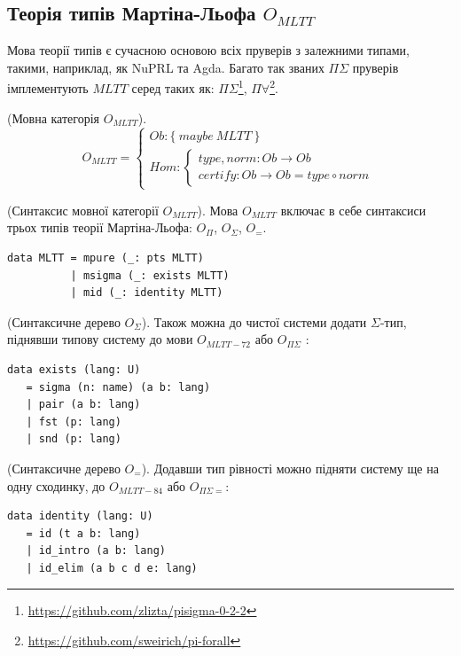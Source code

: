 \newpage
\subsection{Теорія типів Мартіна-Льофа $O_{MLTT}$}

Мова теорії типів є сучасною основою всіх пруверів з залежними типами,
такими, наприклад, як NuPRL та Agda. Багато так званих $\Pi\Sigma$ пруверів
імплементують $MLTT$ серед таких як:
$\Pi\Sigma$\footnote{\url{https://github.com/zlizta/pisigma-0-2-2}},
$\Pi\forall$\footnote{\url{https://github.com/sweirich/pi-forall}}.

\begin{definition} (Мовна категорія $O_{MLTT}$).
\begin{equation}
O_{MLTT} =
\begin{cases}
Ob: \{\ maybe\ MLTT\ \} \\
Hom: \begin{cases}
type,norm: Ob \rightarrow Ob \\
certify: Ob \rightarrow Ob = type \circ norm
\end{cases}
\end{cases}
\end{equation}
\end{definition}

\begin{definition} (Синтаксис мовної категорії $O_{MLTT}$).
Мова $O_{MLTT}$ включає в себе синтаксиси трьох типів
теорії Мартіна-Льофа: $O_\Pi$, $O_\Sigma$, $O_=$.
\begin{lstlisting}
data MLTT = mpure (_: pts MLTT)
          | msigma (_: exists MLTT)
          | mid (_: identity MLTT)
\end{lstlisting}
\end{definition}

\begin{definition} (Синтаксичне дерево $O_\Sigma$).
Також можна до чистої системи додати $\Sigma$-тип,
піднявши типову систему до мови $O_{MLTT-72}$ або $O_{\Pi\Sigma}$ :
\begin{lstlisting}[mathescape=true]
data exists (lang: U)
   = sigma (n: name) (a b: lang)
   | pair (a b: lang)
   | fst (p: lang)
   | snd (p: lang)
\end{lstlisting}
\end{definition}

\begin{definition} (Синтаксичне дерево $O_=$).
Додавши тип рівності можно підняти систему ще на одну сходинку,
до $O_{MLTT-84}$ або $O_{\Pi\Sigma=}$:
\begin{lstlisting}[mathescape=true]
data identity (lang: U)
   = id (t a b: lang)
   | id_intro (a b: lang)
   | id_elim (a b c d e: lang)
\end{lstlisting}
\end{definition}

